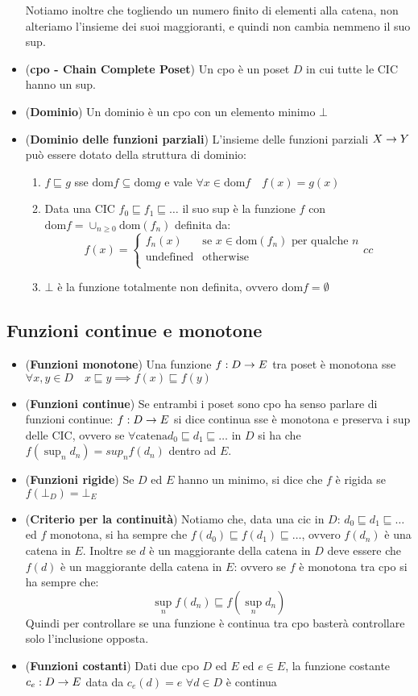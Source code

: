 \documentclass[a4paper,NoNotes,GeneralMath]{stdmdoc}
\newcommand{\sle}{\sqsubseteq}
\newcommand{\dom}{\mbox{dom}}
\newcommand{\leftcurly}[1]{{\left\{{#1}\right.}}
\begin{document}
\begin{itemize}
  Notiamo inoltre che togliendo un numero finito di elementi alla catena, non alteriamo l'insieme dei suoi maggioranti, e quindi non cambia nemmeno il suo sup.
\item ({\bf cpo - Chain Complete Poset}) Un cpo è un poset $D$ in cui tutte le CIC hanno un sup.
\item ({\bf Dominio}) Un dominio è un cpo con un elemento minimo $\bot$
\item ({\bf Dominio delle funzioni parziali}) L'insieme delle funzioni parziali $X \rightarrow Y$ può essere dotato della struttura di dominio:
  \begin{enumerate}
  \item $f \sle g$ sse $\dom f \subseteq \dom g$ e vale $\forall x \in \dom f \quad f(x) = g(x)$
  \item Data una CIC $f_0 \sle f_1 \sle \ldots$ il suo sup è la funzione $f$ con $\dom f = \cup_{n \ge 0} \dom(f_n)$ definita da:
    $$f(x) = \leftcurly{\begin{array}{cc}
                          f_n(x) & \mbox{se } x \in \dom(f_n) \mbox{ per qualche } n \\
                          \mbox{undefined} & \mbox{otherwise} \\
                        \end{array}{cc}}$$
  \item $\bot$ è la funzione totalmente non definita, ovvero $\dom f = \emptyset$
  \end{enumerate}
\end{itemize}

\subsection*{Funzioni continue e monotone}
\begin{itemize}
\item ({\bf Funzioni monotone}) Una funzione $f: D \rightarrow E$ tra poset è monotona sse $\forall x, y \in D \quad x \sle y \implies f(x) \sle f(y)$
\item ({\bf Funzioni continue}) Se entrambi i poset sono cpo ha senso parlare di funzioni continue: $f: D \rightarrow E$ si dice continua sse è monotona e preserva i sup delle CIC, ovvero se $\forall \mbox{catena} d_0 \sle d_1 \sle \ldots$ in $D$ si ha che $f(\sup_n d_n) = sup_n f(d_n)$ dentro ad $E$.
\item ({\bf Funzioni rigide}) Se $D$ ed $E$ hanno un minimo, si dice che $f$ è rigida se $f(\bot_D) = \bot_E$
\item ({\bf Criterio per la continuità}) Notiamo che, data una cic in $D$: $d_0 \sle d_1 \sle \ldots$ ed $f$ monotona, si ha sempre che $f(d_0) \sle f(d_1) \sle \ldots$, ovvero $f(d_n)$ è una catena in $E$. Inoltre se $d$ è un maggiorante della catena in $D$ deve essere che $f(d)$ è un maggiorante della catena in $E$: ovvero se $f$ è monotona tra cpo si ha sempre che:
  $$\sup_n f(d_n) \sle f(\sup_n d_n)$$
  Quindi per controllare se una funzione è continua tra cpo basterà controllare solo l'inclusione opposta.
\item ({\bf Funzioni costanti}) Dati due cpo $D$ ed $E$ ed $e \in E$, la funzione costante $c_e: D \rightarrow E$ data da $c_e(d) = e$ $\forall d \in D$ è continua
\end{itemize}
\end{document}
